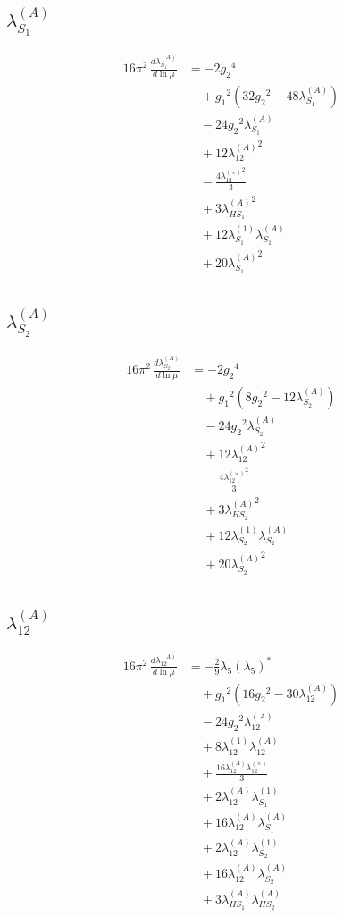 \documentclass[10pt,a4paper]{article}
\begin{document}
\subsection*{$\lambda_{S_1}^{(A)}$}
\begin{align*}
16\pi^2\,\frac{d \lambda_{S_1}^{(A)}}{d\ln\mu} &=-2 {g_2}^4 \\
&\quad +{g_1}^2 \left(32 {g_2}^2-48 {\lambda_{S_1}^{(A)}}\right) \\
&\quad -24 {g_2}^2 {\lambda_{S_1}^{(A)}} \\
&\quad +12 {\lambda_{12}^{(A)}}^2 \\
&\quad -\frac{4 {\lambda_{12}^{(\times)}}^2}{3} \\
&\quad +3 {\lambda_{HS_1}^{(A)}}^2 \\
&\quad +12 {\lambda_{S_1}^{(1)}} {\lambda_{S_1}^{(A)}} \\
&\quad +20 {\lambda_{S_1}^{(A)}}^2 \\
\end{align*}
\subsection*{$\lambda_{S_2}^{(A)}$}
\begin{align*}
16\pi^2\,\frac{d \lambda_{S_2}^{(A)}}{d\ln\mu} &=-2 {g_2}^4 \\
&\quad +{g_1}^2 \left(8 {g_2}^2-12 {\lambda_{S_2}^{(A)}}\right) \\
&\quad -24 {g_2}^2 {\lambda_{S_2}^{(A)}} \\
&\quad +12 {\lambda_{12}^{(A)}}^2 \\
&\quad -\frac{4 {\lambda_{12}^{(\times)}}^2}{3} \\
&\quad +3 {\lambda_{HS_2}^{(A)}}^2 \\
&\quad +12 {\lambda_{S_2}^{(1)}} {\lambda_{S_2}^{(A)}} \\
&\quad +20 {\lambda_{S_2}^{(A)}}^2 \\
\end{align*}
\subsection*{$\lambda_{12}^{(A)}$}
\begin{align*}
16\pi^2\,\frac{d \lambda_{12}^{(A)}}{d\ln\mu} &=-\frac{2}{9} {\lambda_5} \left({\lambda_5}\right)^{*} \\
&\quad +{g_1}^2 \left(16 {g_2}^2-30 {\lambda_{12}^{(A)}}\right) \\
&\quad -24 {g_2}^2 {\lambda_{12}^{(A)}} \\
&\quad +8 {\lambda_{12}^{(1)}} {\lambda_{12}^{(A)}} \\
&\quad +\frac{16 {\lambda_{12}^{(A)}} {\lambda_{12}^{(\times)}}}{3} \\
&\quad +2 {\lambda_{12}^{(A)}} {\lambda_{S_1}^{(1)}} \\
&\quad +16 {\lambda_{12}^{(A)}} {\lambda_{S_1}^{(A)}} \\
&\quad +2 {\lambda_{12}^{(A)}} {\lambda_{S_2}^{(1)}} \\
&\quad +16 {\lambda_{12}^{(A)}} {\lambda_{S_2}^{(A)}} \\
&\quad +3 {\lambda_{HS_1}^{(A)}} {\lambda_{HS_2}^{(A)}} \\
\end{align*}
\end{document}
